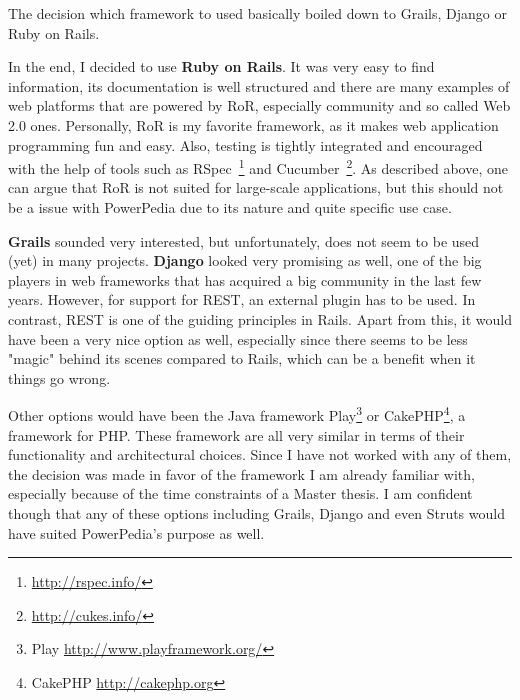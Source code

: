 The decision which framework to used basically boiled down to Grails, Django or Ruby on Rails. 

In the end, I decided to use \textbf{Ruby on Rails}. It was very easy to find information, its documentation is well structured and there are many examples of web platforms that are powered by RoR, especially community and so called Web 2.0 ones.
Personally, RoR is my favorite framework, as it makes web application programming fun and easy. Also, testing is tightly integrated and encouraged with the help of tools such as RSpec~\footnote{\url{http://rspec.info/}} and Cucumber~\footnote{\url{http://cukes.info/}}. As described above, one can argue that RoR is not suited for large-scale applications, but this should not be a issue with PowerPedia due to its nature and quite specific use case.  

\textbf{Grails} sounded very interested, but unfortunately, does not seem to be used (yet) in many projects. \textbf{Django} looked very promising as well, one of the big players in web frameworks that has acquired a big community in the last few years. However, for support for REST, an external plugin has to be used. In contrast, REST is one of the guiding principles in Rails. Apart from this, it would have been a very nice option as well, especially since there seems to be less "magic" behind its scenes compared to Rails, which can be a benefit when it things go wrong.


Other options would have been the Java framework Play\footnote{Play \url{http://www.playframework.org/}} or CakePHP\footnote{CakePHP \url{http://cakephp.org}}, a framework for PHP. These framework are all very similar in terms of their functionality and architectural choices. Since I have not worked with any of them, the decision was made in favor of the framework I am already familiar with, especially because of the time constraints of a Master thesis. I am confident though that any of these options including Grails, Django and even Struts would have suited PowerPedia's purpose as well.
